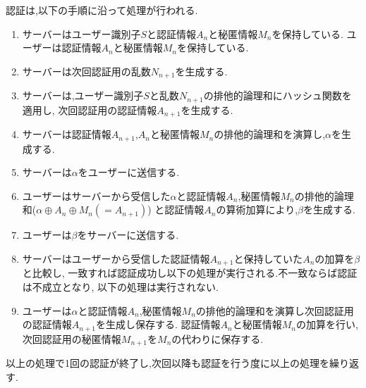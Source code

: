 認証は,以下の手順に沿って処理が行われる.
\begin{enumerate}
	\item サーバーはユーザー識別子$S$と認証情報$A_n$と秘匿情報$M_n$を保持している.
	ユーザーは認証情報$A_n$と秘匿情報$M_n$を保持している.
	\item サーバーは次回認証用の乱数$N_{n+1}$を生成する.
	\item サーバーは,ユーザー識別子$S$と乱数$N_{n+1}$の排他的論理和にハッシュ関数を適用し,
	次回認証用の認証情報$A_{n+1}$を生成する.
	\item サーバーは認証情報$A_{n+1}$,$A_n$と秘匿情報$M_n$の排他的論理和を演算し,$\alpha$を生成する.
	\item サーバーは$\alpha$をユーザーに送信する.
	\item ユーザーはサーバーから受信した$\alpha$と認証情報$A_n$,秘匿情報$M_n$の排他的論理和($\alpha \oplus A_n \oplus M_n(=A_{n+1})$)
	と認証情報$A_n$の算術加算により,$\beta$を生成する.
	\item ユーザーは$\beta$をサーバーに送信する.
	\item サーバーはユーザーから受信した認証情報$A_{n+1}$と保持していた$A_n$の加算を$\beta$と比較し,
	一致すれば認証成功し以下の処理が実行される.不一致ならば認証は不成立となり,
	以下の処理は実行されない.
	\item ユーザーは$\alpha$と認証情報$A_n$,秘匿情報$M_n$の排他的論理和を演算し次回認証用の認証情報$A_{n+1}$を生成し保存する.
	認証情報$A_n$と秘匿情報$M_n$の加算を行い,次回認証用の秘匿情報$M_{n+1}$を$M_n$の代わりに保存する.
\end{enumerate}
以上の処理で1回の認証が終了し,次回以降も認証を行う度に以上の処理を繰り返す.
